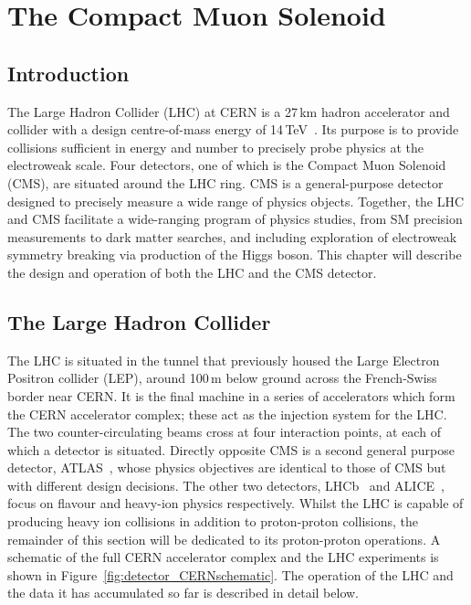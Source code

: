 \chapter{The Compact Muon Solenoid}
\label{chap:detector}

\section{Introduction}

The Large Hadron Collider (LHC) at CERN is a 27\,km hadron accelerator and collider with a design centre-of-mass energy of 14\,TeV~\cite{LHC}.
Its purpose is to provide collisions sufficient in energy and number to precisely probe physics at the electroweak scale.
Four detectors, one of which is the Compact Muon Solenoid (CMS), are situated around the LHC ring.
CMS is a general-purpose detector designed to precisely measure a wide range of physics objects.
Together, the LHC and CMS facilitate a wide-ranging program of physics studies, from SM precision measurements to dark matter searches, 
and including exploration of electroweak symmetry breaking via production of the Higgs boson.
This chapter will describe the design and operation of both the LHC and the CMS detector.

\section{The Large Hadron Collider}

The LHC is situated in the tunnel that previously housed the Large Electron Positron collider (LEP), 
around 100\,m below ground across the French-Swiss border near CERN.
It is the final machine in a series of accelerators which form the CERN accelerator complex; 
these  act as the injection system for the LHC.
The two counter-circulating beams cross at four interaction points, at each of which a detector is situated.
Directly opposite CMS is a second general purpose detector, ATLAS~\cite{ATLAS}, 
whose physics objectives are identical to those of CMS but with different design decisions.
The other two detectors, LHCb~\cite{LHCb} and ALICE~\cite{ALICE}, focus on flavour and heavy-ion physics respectively.
Whilst the LHC is capable of producing heavy ion collisions in addition to proton-proton collisions, 
the remainder of this section will be dedicated to its proton-proton operations.
A schematic of the full CERN accelerator complex and the LHC experiments is shown in Figure~\ref{fig:detector_CERNschematic}.
The operation of the LHC and the data it has accumulated so far is described in detail below.


